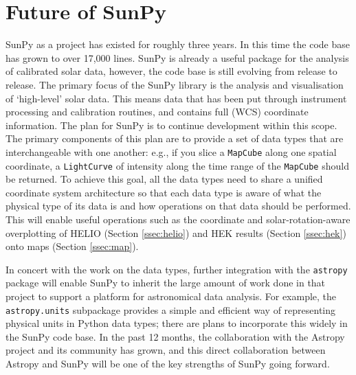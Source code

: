 \section{Future of SunPy}\label{sec:future}
SunPy as a project has existed for roughly three years. In this time 
the code 
base has grown to over 17,000 lines. SunPy is already a 
useful 
package for the analysis of calibrated solar data, however, the code 
base is 
still evolving from release to release.
The primary focus of the 
SunPy library is the analysis and visualisation of `high-level' solar 
data. This means data that has been put through instrument processing 
and 
calibration routines, and contains full (WCS) coordinate information. 
The plan for SunPy is to continue development within this 
scope. The 
primary components of this plan are to provide a set of data types 
that are 
interchangeable with one another: e.g., if you slice a 
\texttt{MapCube} 
along one spatial coordinate, a \texttt{LightCurve} of intensity along the 
time range of 
the \texttt{MapCube} should be returned. To achieve this goal, all the 
data 
types need to share a unified coordinate system architecture so that 
each data 
type is aware of what the physical type of its data is and how 
operations on 
that data should be performed. This will enable useful operations
such as the coordinate and solar-rotation-aware 
overplotting of HELIO (Section \ref{ssec:helio}) and HEK
results (Section \ref{ssec:hek}) onto maps (Section \ref{ssec:map}).

In concert with the work on the data types, further integration with 
the 
\texttt{astropy} package will enable SunPy to inherit the large 
amount of work 
done in that project to support a platform for astronomical data 
analysis. For 
example, the \texttt{astropy.units} subpackage provides a simple and 
efficient 
way of representing physical units in Python data types; there are 
plans to 
incorporate this widely in the SunPy code base. In the past 12 months, 
the 
collaboration with the Astropy project 
\citep{theastropycollaboration2013} and 
its community has grown, and this direct collaboration between Astropy 
and 
SunPy will be one of the key strengths of SunPy going forward.

